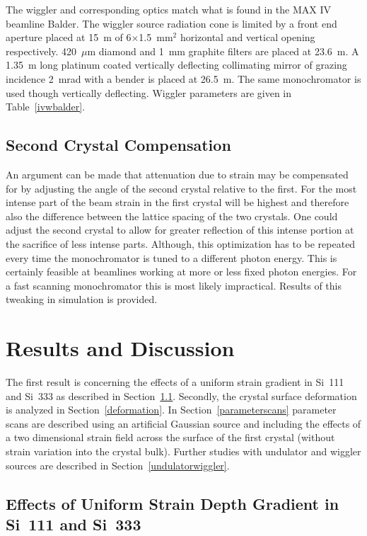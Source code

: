 \documentclass[preprint]{iucr}              %
\begin{document}
The wiggler and corresponding optics match what is found in the MAX IV beamline Balder. The wiggler source radiation cone is limited by a front end aperture placed at 15~m of 6$\times$1.5~mm$^2$ horizontal and vertical opening respectively. 420~$\mu$m diamond and 1~mm graphite filters are placed at 23.6~m. A 1.35~m long platinum coated vertically deflecting collimating mirror of grazing incidence 2~mrad with a bender is placed at 26.5~m. The same monochromator is used though vertically deflecting. Wiggler parameters are given in Table~\ref{ivwbalder}.

\subsection{Second Crystal Compensation}

An argument can be made that attenuation due to strain may be compensated for by adjusting the angle of the second crystal relative to the first. For the most intense part of the beam strain in the first crystal will be highest and therefore also the difference between the lattice spacing of the two crystals. One could adjust the second crystal to allow for greater reflection of this intense portion at the sacrifice of less intense parts. Although, this optimization has to be repeated every time the monochromator is tuned to a different photon energy. This is certainly feasible at beamlines working at more or less fixed photon energies. For a fast scanning monochromator this is most likely impractical. Results of this tweaking in simulation is provided.

\section{Results and Discussion}

The first result is concerning the effects of a uniform strain gradient in Si~111 and Si~333 as described in Section~\ref{strain_results}. Secondly, the crystal surface deformation is analyzed in Section~\ref{deformation}. In Section~\ref{parameterscans} parameter scans are described using an artificial Gaussian source and including the effects of a two dimensional strain field across the surface of the first crystal (without strain variation into the crystal bulk). Further studies with undulator and wiggler sources are described in Section~\ref{undulatorwiggler}.

\subsection{Effects of Uniform Strain Depth Gradient in Si~111 and Si~333}\label{strain_results}
\end{document}
